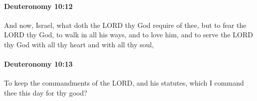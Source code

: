 		\paragraph{Deuteronomy 10:12} %
			\label{DEUTERONOMY-10-12}

			And now, Israel, what doth the LORD thy God require of thee, but to fear the LORD thy God, to walk in all his ways, and to love him, and to serve the LORD thy God with all thy heart and with all thy soul,


		\paragraph{Deuteronomy 10:13} %
			\label{DEUTERONOMY-10-13}

			To keep the commandments of the LORD, and his statutes, which I command thee this day for thy good?



